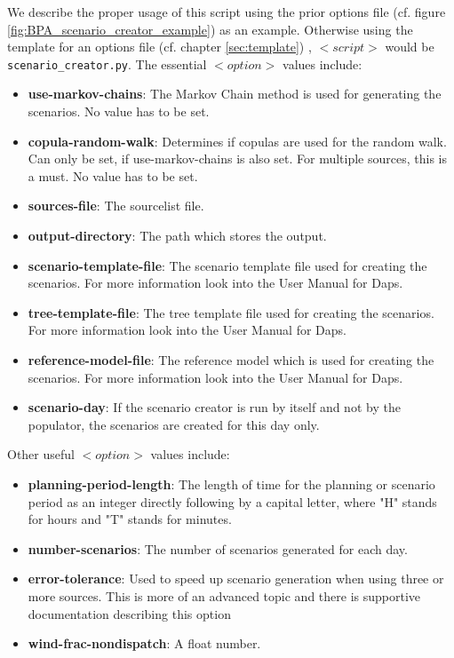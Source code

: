 \documentclass[11pt]{article}
\begin{document}
We describe the proper usage of this script using the prior options file (cf. figure \ref{fig:BPA_scenario_creator_example}) as an example. Otherwise using the template for an options file (cf. chapter \ref{sec:template}) , $<script>$ would be \texttt{scenario\_creator.py}. The essential $<option>$ values include:
\begin{itemize}
	\item \textbf{use-markov-chains}: The Markov Chain method is used for generating the scenarios. No value has to be set.
	\item \textbf{copula-random-walk}: Determines if copulas are used for the random walk. Can only be set, if use-markov-chains is also set. For multiple sources, this is a must. No value has to be set.
	\item \textbf{sources-file}: The sourcelist file.
	\item \textbf{output-directory}: The path which stores the output.
	\item \textbf{scenario-template-file}: The scenario template file  used for creating the scenarios. For more information look into the User Manual for Daps.
	\item \textbf{tree-template-file}: The tree template file used for creating the scenarios. For more information look into the User Manual for Daps.
	\item \textbf{reference-model-file}: The reference model which is used for creating the scenarios. For more information look into the User Manual for Daps.
	\item \textbf{scenario-day}: If the scenario creator is run by itself and not by the populator, the scenarios are created for this day only. 
\end{itemize}

Other useful $<option>$ values include: 

\begin{itemize}
	\item \textbf{planning-period-length}: The length of time for the planning or scenario period as an integer directly following by a capital letter, where "H" stands for hours and "T" stands for minutes.
	\item \textbf{number-scenarios}: The number of scenarios generated for each day.
	\item \textbf{error-tolerance}: Used to speed up scenario generation when using three or more sources. This is more of an advanced topic and there is supportive documentation describing this option
	\item \textbf{wind-frac-nondispatch}: A float number.
\end{itemize}
\end{document}
